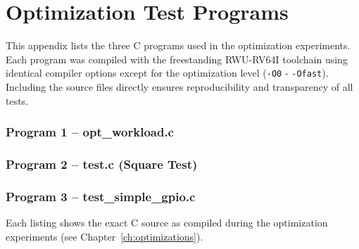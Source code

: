 \clearpage
\chapter{Optimization Test Programs}
\label{app:optimization-programs}

This appendix lists the three C programs used in the optimization experiments.  
Each program was compiled with the freestanding RWU-RV64I toolchain using identical compiler options except for the optimization level (\texttt{-O0} - \texttt{-Ofast}).  
Including the source files directly ensures reproducibility and transparency of all tests.

\subsection*{Program 1 – opt\_workload.c}


\subsection*{Program 2 – test.c (Square Test)}


\subsection*{Program 3 – test\_simple\_gpio.c}


\bigskip
\noindent
Each listing shows the exact C source as compiled during the optimization experiments (see Chapter~\ref{ch:optimizations}).
